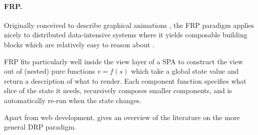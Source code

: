 \paragraph{\gls{FRP}.}
Originally conceived to describe graphical animations \cite{elliott1997functional}, the FRP paradigm applies nicely to distributed data-intensive systems where it yields composable building blocks which are relatively easy to reason about \cite{reynders2014multi}.

FRP fits particularly well inside the view layer of a \gls{SPA} to construct the view out of (nested) pure functions $v=f(s)$ which take a global state value and return a description of what to render. Each component function specifies what slice of the state it needs, recursively composes smaller components, and is automatically re-run when the state changes.

Apart from web development, \cite{salvaneschi2013towards} gives an overview of the literature on the more general \gls{DRP} paradigm.

